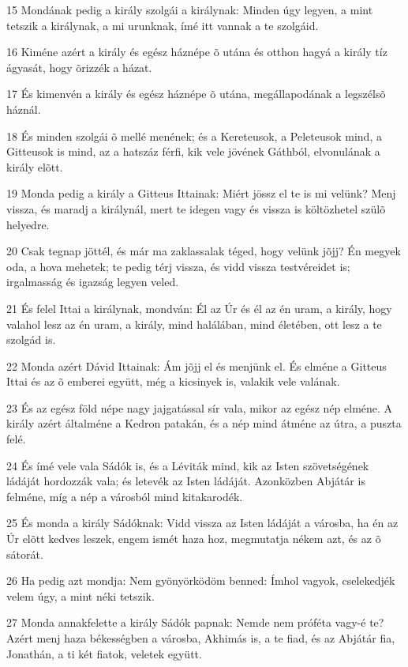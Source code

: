 \par 15 Mondának pedig a király szolgái a királynak: Minden úgy legyen, a mint tetszik a királynak, a mi urunknak, ímé itt vannak a te szolgáid.
\par 16 Kiméne azért a király és egész háznépe õ utána és otthon hagyá a király tíz ágyasát, hogy õrizzék a házat.
\par 17 És kimenvén a király és egész háznépe õ utána, megállapodának a legszélsõ háznál.
\par 18 És minden szolgái õ mellé menének; és a Kereteusok, a Peleteusok mind, a  Gitteusok is mind, az a hatszáz férfi, kik vele jövének Gáthból, elvonulának a király elõtt.
\par 19 Monda pedig a király a Gitteus Ittainak: Miért jössz el te is mi velünk? Menj vissza, és maradj a királynál, mert te idegen vagy és vissza is költözhetel szülõ helyedre.
\par 20 Csak tegnap jöttél, és már ma zaklassalak téged, hogy velünk jõjj? Én megyek oda, a hova mehetek; te pedig térj vissza, és vidd vissza testvéreidet is; irgalmasság és igazság legyen veled.
\par 21 És felel Ittai a királynak, mondván: Él az Úr és él az én uram, a király, hogy valahol lesz az én uram, a király, mind halálában, mind életében, ott lesz a te szolgád is.
\par 22 Monda azért Dávid Ittainak: Ám jõjj el és menjünk el. És elméne a Gitteus Ittai és az õ emberei együtt, még a kicsinyek is, valakik vele valának.
\par 23 És az egész föld népe nagy jajgatással sír vala, mikor az egész nép elméne. A király azért általméne a Kedron patakán, és a nép mind átméne az útra, a puszta felé.
\par 24 És ímé vele vala Sádók is, és a Léviták mind, kik az Isten szövetségének ládáját hordozzák vala; és letevék az Isten ládáját. Azonközben Abjátár  is felméne, míg a nép a városból mind kitakarodék.
\par 25 És monda a király Sádóknak: Vidd vissza az Isten ládáját a városba, ha én az Úr elõtt kedves leszek, engem ismét haza hoz, megmutatja nékem azt, és az õ sátorát.
\par 26 Ha pedig azt mondja: Nem gyönyörködöm benned: Ímhol vagyok, cselekedjék velem úgy, a mint néki tetszik.
\par 27 Monda annakfelette a király Sádók papnak: Nemde nem próféta vagy-é te? Azért menj haza békességben a városba, Akhimás is, a te fiad, és az Abjátár fia, Jonathán, a ti két fiatok, veletek együtt.
